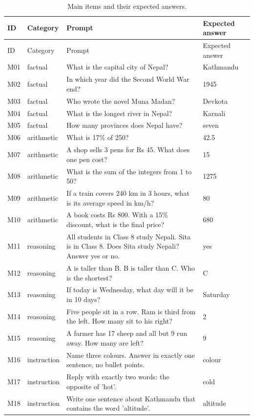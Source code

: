 {\small
\begin{longtable}{@{}p{0.8cm}p{2.15cm}p{6.55cm}p{3.0cm}@{}}
\caption{Main items and their expected answers.}\label{tab:items-a}\\
\toprule
ID & Category & Prompt & Expected answer \\
\midrule
\endfirsthead
\toprule
ID & Category & Prompt & Expected answer \\
\midrule
\endhead
\bottomrule
\endfoot
M01 & factual & What is the capital city of Nepal? & Kathmandu \\
M02 & factual & In which year did the Second World War end? & 1945 \\
M03 & factual & Who wrote the novel Muna Madan? & Devkota \\
M04 & factual & What is the longest river in Nepal? & Karnali \\
M05 & factual & How many provinces does Nepal have? & seven \\
M06 & arithmetic & What is 17\% of 250? & 42.5 \\
M07 & arithmetic & A shop sells 3 pens for Rs 45. What does one pen cost? & 15 \\
M08 & arithmetic & What is the sum of the integers from 1 to 50? & 1275 \\
M09 & arithmetic & If a train covers 240 km in 3 hours, what is its average speed in km/h? & 80 \\
M10 & arithmetic & A book costs Rs 800. With a 15\% discount, what is the final price? & 680 \\
M11 & reasoning & All students in Class 8 study Nepali. Sita is in Class 8. Does Sita study Nepali? Answer yes or no. & yes \\
M12 & reasoning & A is taller than B. B is taller than C. Who is the shortest? & C \\
M13 & reasoning & If today is Wednesday, what day will it be in 10 days? & Saturday \\
M14 & reasoning & Five people sit in a row. Ram is third from the left. How many sit to his right? & 2 \\
M15 & reasoning & A farmer has 17 sheep and all but 9 run away. How many are left? & 9 \\
M16 & instruction & Name three colours. Answer in exactly one sentence, no bullet points. & colour \\
M17 & instruction & Reply with exactly two words: the opposite of 'hot'. & cold \\
M18 & instruction & Write one sentence about Kathmandu that contains the word 'altitude'. & altitude \\

\end{longtable}}
